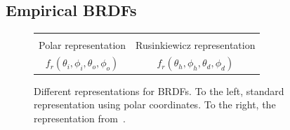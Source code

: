 \subsection{Empirical BRDFs}
\begin{figure}
\centering
\begin{tabular}{@{}c@{\hskip 1em}c@{}}
\def\svgwidth{0.45\textwidth} &  \def\svgwidth{0.45\textwidth} \\
Polar representation &  Rusinkiewicz representation \\
$f_r(\theta_i, \phi_i, \theta_o, \phi_o)$ &  $f_r(\theta_h, \phi_h, \theta_d, \phi_d)$ \\
\end{tabular}
\caption{Different representations for BRDFs. To the left, standard representation using polar coordinates. To the right, the representation from~\cite{Rusinkiewicz1998}. } 
\label{fig:brdfrepr}
\end{figure}

